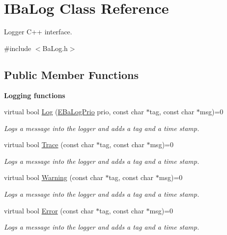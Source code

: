 \hypertarget{classIBaLog}{}\section{I\+Ba\+Log Class Reference}
\label{classIBaLog}


Logger C++ interface.  




{\ttfamily \#include $<$Ba\+Log.\+h$>$}

\subsection*{Public Member Functions}
\begin{Indent}{\bf Logging functions}\par
\begin{DoxyCompactItemize}
\item 
virtual bool \hyperlink{classIBaLog_aa5af90c31d02caaf2ce598eb71f774ad}{Log} (\hyperlink{BaLog_8h_ab14f00a81932b8b62d2e8c4a2d7e3916}{E\+Ba\+Log\+Prio} prio, const char $\ast$tag, const char $\ast$msg)=0
\begin{DoxyCompactList}\small\item\em Logs a message into the logger and adds a {\ttfamily tag} and a time stamp. \end{DoxyCompactList}\item 
virtual bool \hyperlink{classIBaLog_a3daf158cda6813367b7324ef5171291b}{Trace} (const char $\ast$tag, const char $\ast$msg)=0
\begin{DoxyCompactList}\small\item\em Logs a message into the logger and adds a {\ttfamily tag} and a time stamp. \end{DoxyCompactList}\item 
virtual bool \hyperlink{classIBaLog_a47861c723ea82ba833d71a698a972bd0}{Warning} (const char $\ast$tag, const char $\ast$msg)=0
\begin{DoxyCompactList}\small\item\em Logs a message into the logger and adds a {\ttfamily tag} and a time stamp. \end{DoxyCompactList}\item 
virtual bool \hyperlink{classIBaLog_a58b60a1b38183c0eea84677cb0ab5853}{Error} (const char $\ast$tag, const char $\ast$msg)=0
\begin{DoxyCompactList}\small\item\em Logs a message into the logger and adds a {\ttfamily tag} and a time stamp. \end{DoxyCompactList}\end{DoxyCompactItemize}
\end{Indent}

